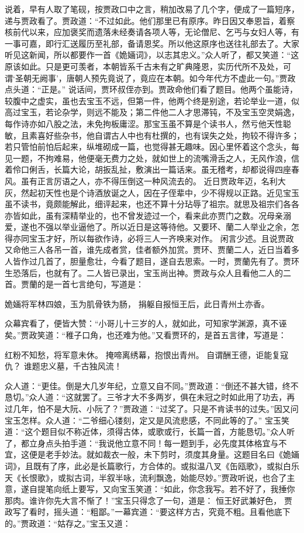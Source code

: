 \documentclass[12pt,oneside]{book}
\begin{document}
说着，早有人取了笔砚，按贾政口中之言，稍加改易了几个字，便成了一篇短序，递与贾政看了。贾政道：“不过如此。他们那里已有原序。昨日因又奉恩旨，着察核前代以来，应加褒奖而遗落未经奏请各项人等，无论僧尼、乞丐与女妇人等，有一事可嘉，即行汇送履历至礼部，备请恩奖。所以他这原序也送往礼部去了。大家听见这新闻，所以都要作一首《姽婳词》，以志其忠义。”众人听了，都又笑道：“这原该如此。只是更可羡者，本朝皆系千古未有之旷典隆恩，实历代所不及处，可谓‘圣朝无阙事’，唐朝人预先竟说了，竟应在本朝。如今年代方不虚此一句。”贾政点头道：“正是。”
说话间，贾环叔侄亦到。贾政命他们看了题目。他两个虽能诗，较腹中之虚实，虽也去宝玉不远，但第一件，他两个终是别途，若论举业一道，似高过宝玉，若论杂学，则远不能及；第二件他二人才思滞钝，不及宝玉空灵娟逸，每作诗亦如八股之法，未免拘板庸涩。那宝玉虽不算是个读书人，然亏他天性聪敏，且素喜好些杂书，他自谓古人中也有杜撰的，也有误失之处，拘较不得许多；若只管怕前怕后起来，纵堆砌成一篇，也觉得甚无趣味。因心里怀着这个念头，每见一题，不拘难易，他便毫无费力之处，就如世上的流嘴滑舌之人，无风作浪，信着伶口俐舌，长篇大论，胡扳乱扯，敷演出一篇话来。虽无稽考，却都说得四座春风。虽有正言厉语之人，亦不得压倒这一种风流去的。
近日贾政年迈，名利大灰，然起初天性也是个诗酒放诞之人，因在子侄辈中，少不得规以正路。近见宝玉虽不读书，竟颇能解此，细评起来，也还不算十分玷辱了祖宗。就思及祖宗们各各亦皆如此，虽有深精举业的，也不曾发迹过一个，看来此亦贾门之数。况母亲溺爱，遂也不强以举业逼他了。所以近日是这等待他。又要环、蘭二人举业之余，怎得亦同宝玉才好，所以每欲作诗，必将三人一齐唤来对作。
闲言少述。且说贾政又命他三人各吊一首，谁先成者赏，佳者额外加赏。贾环、贾蘭二人，近日当着多人皆作过几首了，胆量愈壮，今看了题目，遂自去思索。一时，贾蘭先有了。贾环生恐落后，也就有了。二人皆已录出，宝玉尚出神。贾政与众人且看他二人的二首。贾蘭的是一首七言绝句，写道是：

姽婳将军林四娘，玉为肌骨铁为肠，
捐躯自报恒王后，此日青州土亦香。

众幕宾看了，便皆大赞：“小哥儿十三岁的人，就如此，可知家学渊源，真不诬矣。”贾政笑道：“稚子口角，也还难为他。”又看贾环的，是首五言律，写道是：

红粉不知愁，将军意未休。
掩啼离绣幕，抱恨出青州。
自谓酬王德，讵能复寇仇？
谁题忠义墓，千古独风流！

众人道：“更佳。倒是大几岁年纪，立意又自不同。”贾政道：“倒还不甚大错，终不恳切。”众人道：“这就罢了。三爷才大不多两岁，俱在未冠之时如此用了功去，再过几年，怕不是大阮、小阮了？”贾政道：“过奖了。只是不肯读书的过失。”因又问宝玉怎样。众人道：“二爷细心镂刻，定又是风流悲感，不同此等的了。”
宝玉笑道：“这个题目似不称近体，须得古体，或歌或行，长篇一首，方能恳切。”众人听了，都立身点头拍手道：“我说他立意不同！每一题到手，必先度其体格宜与不宜，这便是老手妙法。就如裁衣一般，未下剪时，须度其身量。这题目名曰《姽婳词》，且既有了序，此必是长篇歌行，方合体的。或拟温八叉《缶瓯歌》，或拟白乐天《长恨歌》，或拟古词，半叙半咏，流利飘逸，始能尽妙。”贾政听说，也合了主意，遂自提笔向纸上要写，又向宝玉笑道：“如此，你念我写。若不好了，我捶你那肉。谁许你先大言不惭了！”宝玉只得念了一句，道是：
恒王好武兼好色，
贾政写了看时，摇头道：“粗鄙。”一幕宾道：“要这样方古，究竟不粗。且看他底下的。”贾政道：“姑存之。”宝玉又道：
\end{document}
